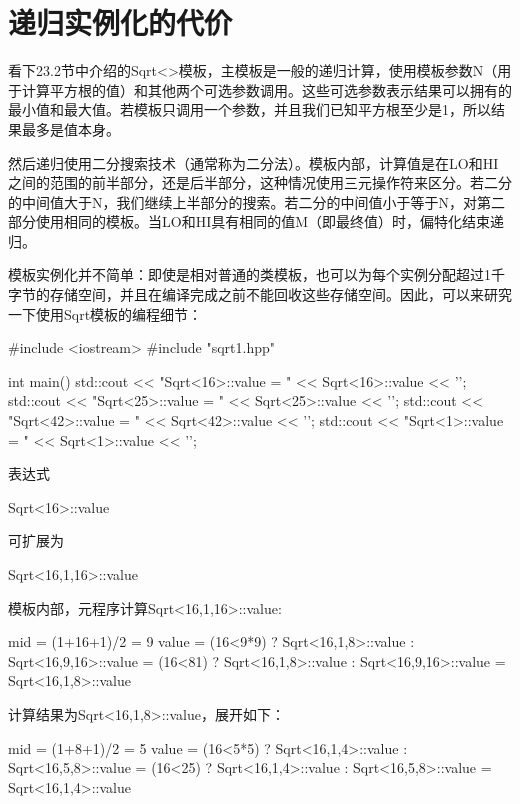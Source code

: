 \section{递归实例化的代价}

看下23.2节中介绍的Sqrt<>模板，主模板是一般的递归计算，使用模板参数N（用于计算平方根的值）和其他两个可选参数调用。这些可选参数表示结果可以拥有的最小值和最大值。若模板只调用一个参数，并且我们已知平方根至少是1，所以结果最多是值本身。

然后递归使用二分搜索技术（通常称为二分法）。模板内部，计算值是在LO和HI之间的范围的前半部分，还是后半部分，这种情况使用三元操作符来区分。若二分的中间值大于N，我们继续上半部分的搜索。若二分的中间值小于等于N，对第二部分使用相同的模板。当LO和HI具有相同的值M（即最终值）时，偏特化结束递归。

模板实例化并不简单：即使是相对普通的类模板，也可以为每个实例分配超过1千字节的存储空间，并且在编译完成之前不能回收这些存储空间。因此，可以来研究一下使用Sqrt模板的编程细节：

\begin{cpp}
#include <iostream>
#include "sqrt1.hpp"

int main() {
	std::cout << "Sqrt<16>::value = " << Sqrt<16>::value << '\n';
	std::cout << "Sqrt<25>::value = " << Sqrt<25>::value << '\n';
	std::cout << "Sqrt<42>::value = " << Sqrt<42>::value << '\n';
	std::cout << "Sqrt<1>::value = " << Sqrt<1>::value << '\n';
}
\end{cpp}

表达式

\begin{cpp}
Sqrt<16>::value
\end{cpp}

可扩展为

\begin{cpp}
Sqrt<16,1,16>::value
\end{cpp}

模板内部，元程序计算Sqrt<16,1,16>::value:

\begin{cpp}
mid = (1+16+1)/2
	= 9
value = (16<9*9) ? Sqrt<16,1,8>::value
				: Sqrt<16,9,16>::value
	  = (16<81) ? Sqrt<16,1,8>::value
				: Sqrt<16,9,16>::value
	  = Sqrt<16,1,8>::value
\end{cpp}

计算结果为Sqrt<16,1,8>::value，展开如下：

\begin{cpp}
mid = (1+8+1)/2
	= 5
value = (16<5*5) ? Sqrt<16,1,4>::value
				: Sqrt<16,5,8>::value
	  = (16<25) ? Sqrt<16,1,4>::value
				: Sqrt<16,5,8>::value
	  = Sqrt<16,1,4>::value
\end{cpp}

